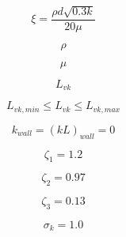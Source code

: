 {\newpage\clearpage
{}%
\begin{displaymath}
\xi = \frac{\rho d \sqrt{0.3 k}}{20 \mu}
\end{displaymath}%
\lthtmldisplayZ
\lthtmlcheckvsize\clearpage}

{\newpage\clearpage
{}%
\begin{displaymath}
\rho
\end{displaymath}%
\lthtmldisplayZ
\lthtmlcheckvsize\clearpage}

{\newpage\clearpage
{}%
\begin{displaymath}
\mu
\end{displaymath}%
\lthtmldisplayZ
\lthtmlcheckvsize\clearpage}

{\newpage\clearpage
{}%
\begin{displaymath}
L_{vk}
\end{displaymath}%
\lthtmldisplayZ
\lthtmlcheckvsize\clearpage}

{\newpage\clearpage
{}%
\begin{displaymath}
L_{vk,min} \leq L_{vk} \leq L_{vk,max}
\end{displaymath}%
\lthtmldisplayZ
\lthtmlcheckvsize\clearpage}

{\newpage\clearpage
{}%
\begin{displaymath}
k_{wall} = (kL)_{wall} = 0
\end{displaymath}%
\lthtmldisplayZ
\lthtmlcheckvsize\clearpage}

{\newpage\clearpage
{}%
\begin{displaymath}
\zeta_1 = 1.2
\end{displaymath}%
\lthtmldisplayZ
\lthtmlcheckvsize\clearpage}

{\newpage\clearpage
{}%
\begin{displaymath}
\zeta_2 = 0.97
\end{displaymath}%
\lthtmldisplayZ
\lthtmlcheckvsize\clearpage}

{\newpage\clearpage
{}%
\begin{displaymath}
\zeta_3 = 0.13
\end{displaymath}%
\lthtmldisplayZ
\lthtmlcheckvsize\clearpage}

{\newpage\clearpage
{}%
\begin{displaymath}
\sigma_k = 1.0
\end{displaymath}%
\lthtmldisplayZ
\lthtmlcheckvsize\clearpage}

